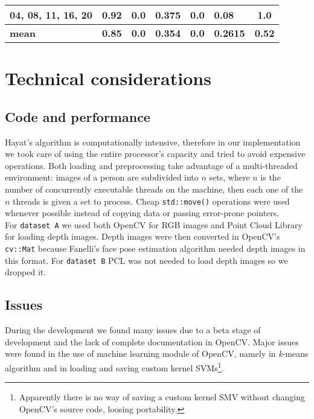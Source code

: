 \documentclass{article}
\begin{document}
\begin{table}[]
\begin{adjustwidth}{-.75in}{-.75in}
\begin{tabular}{|l|l|c|l|c|l|c|}
			04, 08, 11, 16, 20               & 0.92       & 0.0                       & 0.375      & 0.0                         & 0.08       & 1.0\\ \hline

			\bf mean                         & \bf 0.85   & \bf 0.0                   & \bf 0.354 & \bf 0.0                     & \bf 0.2615   & \bf 0.52\\ \hline
		\end{tabular}
	\end{adjustwidth}
\end{table}


\section{Technical considerations}
	
	\subsection{Code and performance} \label{sec:code}
	Hayat's algorithm is computationally intensive, therefore in our implementation we took care of using the entire processor's capacity and tried to avoid expensive operations. Both loading and preprocessing take advantage of a multi-threaded environment: images of a person are subdivided into $n$ sets, where $n$ is the number of concurrently executable threads on the machine, then each one of the $n$ threads is given a set to process. Cheap \verb|std::move()| operations were used whenever possible instead of copying data or passing error-prone pointers. \\
	For \verb|dataset A| we used both OpenCV for RGB images and Point Cloud Library for loading depth images. Depth images were then converted in OpenCV's \verb|cv::Mat| because Fanelli's face pose estimation algorithm needed depth images in this format. For \verb|dataset B| PCL was not needed to load depth images so we dropped it. \\
	
	\subsection{Issues}
	During the development we found many issues due to a beta stage of development  and the lack of complete documentation in OpenCV. Major issues were found in the use of machine learning module of OpenCV, namely in \textit{k}-means algorithm and in loading and saving custom kernel SVMs\footnote{Apparently there is no way of saving a custom kernel SMV without changing OpenCV's source code, loosing portability.}.
	
\end{document}
